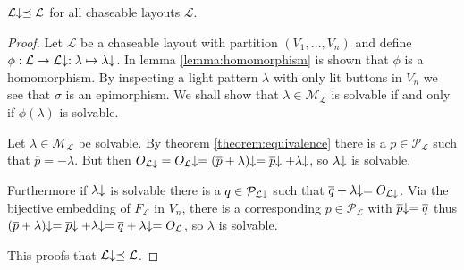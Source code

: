 \begin{theorem}
	$\mathcal{L}\negthickspace\downarrow \preceq \mathcal{L}$ for all chaseable layouts
	$\mathcal{L}$.
\end{theorem}

\begin{proof}
	Let $\mathcal{L}$ be a chaseable layout with partition
	$(V_{1},\ldots,V_{n})$ and define $\phi : \mathcal{L} \rightarrow
	\mathcal{L}\negthickspace\downarrow : \lambda \mapsto \lambda\negthickspace\downarrow$. In lemma
	\ref{lemma:homomorphism} is shown that $\phi$ is a homomorphism. By
	inspecting a light pattern $\lambda$ with only lit buttons in $V_{n}$ we
	see that $\sigma$ is an epimorphism. We	shall show that $\lambda \in
	\mathcal{M}_{\mathcal{L}}$ is solvable if and only if $\phi( \lambda )$
	is solvable.
		
	Let $\lambda \in \mathcal{M}_{\mathcal{L}}$ be solvable. By theorem
	\ref{theorem:equivalence} there is a $p\in\mathcal{P}_{\mathcal{L}}$
	such that $\overline{p}=-\lambda$. But then $O_{\mathcal{L\;\negthickspace\downarrow}} =
	O_{\mathcal{L}}\negthickspace\downarrow = (\overline{p}+\lambda)\negthickspace\downarrow = \overline{p}\negthickspace\downarrow +
	\lambda\negthickspace\downarrow$, so $\lambda\negthickspace\downarrow$ is solvable.

	Furthermore if $\lambda\negthickspace\downarrow$ is solvable there is a $q \in
	\mathcal{P}_{\mathcal{L}\;\negthickspace\downarrow}$ such that $\overline{q} + \lambda\negthickspace\downarrow =
	O_{\mathcal{L}\;\negthickspace\downarrow}$. Via the bijective embedding of $F_{\mathcal{L}}$
	in $V_{n}$, there is a corresponding $p\in\mathcal{P}_{\mathcal{L}}$ with
	$\overline{p}\negthickspace\downarrow = \overline{q}$ thus $(\overline{p} + \lambda)\negthickspace\downarrow =
	\overline{p}\negthickspace\downarrow + \lambda\negthickspace\downarrow = \overline{q} + \lambda\negthickspace\downarrow =
	O_{\mathcal{L}}$, so $\lambda$ is solvable.
	
	This proofs that $\mathcal{L}\negthickspace\downarrow \preceq \mathcal{L}$.
\end{proof}


